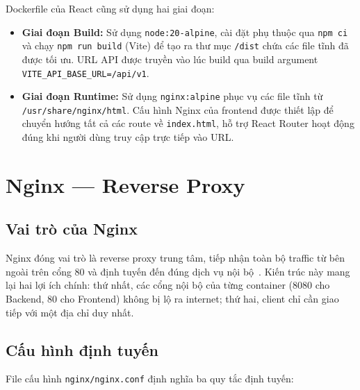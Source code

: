 Dockerfile của React cũng sử dụng hai giai đoạn:

\begin{itemize}
    \item \textbf{Giai đoạn Build:} Sử dụng \texttt{node:20-alpine}, cài đặt
          phụ thuộc qua \texttt{npm ci} và chạy \texttt{npm run build} (Vite)
          để tạo ra thư mục \texttt{/dist} chứa các file tĩnh đã được tối ưu.
          URL API được truyền vào lúc build qua build argument
          \texttt{VITE\_API\_BASE\_URL=/api/v1}.

    \item \textbf{Giai đoạn Runtime:} Sử dụng \texttt{nginx:alpine} phục vụ
          các file tĩnh từ \texttt{/usr/share/nginx/html}. Cấu hình Nginx
          của frontend được thiết lập để chuyển hướng tất cả các route về
          \texttt{index.html}, hỗ trợ React Router hoạt động đúng khi người
          dùng truy cập trực tiếp vào URL.
\end{itemize}

\section{Nginx --- Reverse Proxy}

\subsection{Vai trò của Nginx}

Nginx đóng vai trò là reverse proxy trung tâm, tiếp nhận toàn bộ traffic từ
bên ngoài trên cổng 80 và định tuyến đến đúng dịch vụ nội bộ~\cite{nginx}.
Kiến trúc này mang lại hai lợi ích chính: thứ nhất, các cổng nội bộ của từng
container (8080 cho Backend, 80 cho Frontend) không bị lộ ra internet; thứ hai,
client chỉ cần giao tiếp với một địa chỉ duy nhất.

\subsection{Cấu hình định tuyến}

File cấu hình \texttt{nginx/nginx.conf} định nghĩa ba quy tắc định tuyến:

